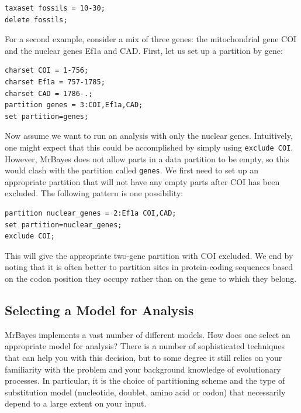 \documentclass[12pt]{book}
\begin{document}
\begin{Verbatim}
taxaset fossils = 10-30;
delete fossils;
\end{Verbatim}

For a second example, consider a mix of three genes: the mitochondrial gene COI and the nuclear
genes Ef1a and CAD. First, let us set up a partition by gene:

\begin{Verbatim}
charset COI = 1-756;
charset Ef1a = 757-1785;
charset CAD = 1786-.;
partition genes = 3:COI,Ef1a,CAD;
set partition=genes;
\end{Verbatim}

Now assume we want to run an analysis with only the nuclear genes. Intuitively, one might expect
that this could be accomplished by simply using \texttt{exclude COI}. However, MrBayes does not
allow parts in a data partition to be empty, so this would clash with the partition called
\texttt{genes}.  We first need to set up an appropriate partition that will not have any empty
parts after COI has been excluded. The following pattern is one possibility:

\begin{Verbatim}
partition nuclear_genes = 2:Ef1a COI,CAD;
set partition=nuclear_genes;
exclude COI;
\end{Verbatim}

This will give the appropriate two-gene partition with COI excluded. We end by noting that it is
often better to partition sites in protein-coding sequences based on the codon position they occupy
rather than on the gene to which they belong.

\subsection{Selecting a Model for Analysis}

MrBayes implements a vast number of different models. How does one select an appropriate model for
analysis? There is a number of sophisticated techniques that can help you with this decision, but
to some degree it still relies on your familiarity with the problem and your background knowledge
of evolutionary processes. In particular, it is the choice of partitioning scheme and the type of
substitution model (nucleotide, doublet, amino acid or codon) that necessarily depend to a large
extent on your input.
\end{document}
